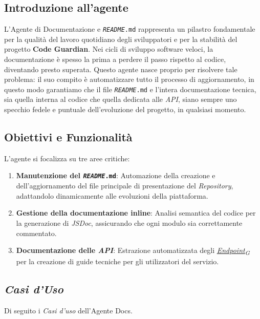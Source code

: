 \documentclass[12pt, a4paper]{article}
\newcommand{\urlglossario}{https://skynetunigroup.github.io/Code_Guardian/Documentazione/PB/glossario_v2.0.0.pdf} %
\newcommand{\glo}[2]{\href{\urlglossario\#nameddest=#2}{#1\textsubscript{G}}}
\begin{document}
\subsection{Introduzione all'agente}
L'Agente di Documentazione e \texttt{\textit{README}.md} rappresenta un pilastro fondamentale per la qualità del lavoro quotidiano degli sviluppatori e per la stabilità del progetto \textbf{Code Guardian}. Nei cicli di sviluppo software veloci, la documentazione è spesso la prima a perdere il passo rispetto al codice, diventando presto superata. Questo agente nasce proprio per risolvere tale problema: il suo compito è automatizzare tutto il processo di aggiornamento, in questo modo garantiamo che il file \texttt{\textit{README}.md} e l'intera documentazione tecnica, sia quella interna al codice che quella dedicata alle \textit{API}, siano sempre uno specchio fedele e puntuale dell'evoluzione del progetto, in qualsiasi momento.

\subsection{Obiettivi e Funzionalità}
L'agente si focalizza su tre aree critiche:

\begin{enumerate}

    \item \textbf{Manutenzione del \texttt{\textit{README}.md}}: Automazione della creazione e dell'aggiornamento del file principale di presentazione del \textit{Repository}, adattandolo dinamicamente alle evoluzioni della piattaforma.

    \item \textbf{Gestione della documentazione inline}: Analisi semantica del codice per la generazione di \textit{JSDoc}, assicurando che ogni modulo sia correttamente commentato.

    \item \textbf{Documentazione delle \textit{API}}: Estrazione automatizzata degli \textit{\glo{Endpoint}{endpoint}} per la creazione di guide tecniche per gli utilizzatori del servizio.

\end{enumerate}

\newpage
\subsection{\textit{Casi d'Uso}}
Di seguito i \textit{Casi d'uso} dell'Agente Docs.
\end{document}
